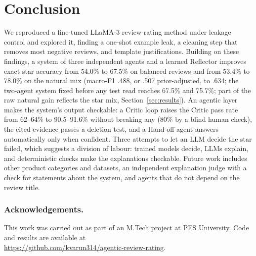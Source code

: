 \documentclass[runningheads]{llncs}
\begin{document}
\section{Conclusion}

We reproduced a fine-tuned LLaMA-3 review-rating method under leakage control and explored it, finding a one-shot example leak, a cleaning step that removes most negative reviews, and template justifications. Building on these findings, a system of three independent agents and a learned Reflector improves exact star accuracy from 54.0\% to 67.5\% on balanced reviews and from 53.4\% to 78.0\% on the natural mix (macro-F1 .488, or .507 prior-adjusted, to .634; the two-agent system fixed before any test read reaches 67.5\% and 75.7\%; part of the raw natural gain reflects the star mix, Section~\ref{sec:results}). An agentic layer makes the system's output checkable: a Critic loop raises the Critic pass rate from 62--64\% to 90.5--91.6\% without breaking any (80\% by a blind human check), the cited evidence passes a deletion test, and a Hand-off agent answers automatically only when confident. Three attempts to let an LLM decide the star failed, which suggests a division of labour: trained models decide, LLMs explain, and deterministic checks make the explanations checkable. Future work includes other product categories and datasets, an independent explanation judge with a check for statements about the system, and agents that do not depend on the review title.

\subsubsection*{Acknowledgements.} This work was carried out as part of an M.Tech project at PES University. Code and results are available at\\ \url{https://github.com/kvarun314/agentic-review-rating}.
\end{document}
